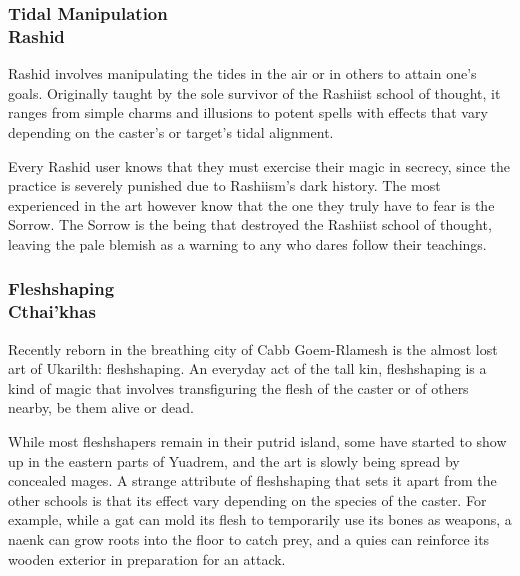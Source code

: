 \subsubsection{Tidal Manipulation\\ \small{Rashid}} %
Rashid involves manipulating the tides in the air or in others to attain one's goals.
Originally taught by the sole survivor of the Rashiist school of thought, it ranges from simple charms and illusions to potent spells with effects that vary depending on the caster's or target's tidal alignment.

Every Rashid user knows that they must exercise their magic in secrecy, since the practice is severely punished due to Rashiism's dark history.
The most experienced in the art however know that the one they truly have to fear is the Sorrow.
The Sorrow is the being that destroyed the Rashiist school of thought, leaving the pale blemish as a warning to any who dares follow their teachings.

\subsubsection{Fleshshaping\\ \small{Cthai'khas}} %
Recently reborn in the breathing city of Cabb Goem-Rlamesh is the almost lost art of Ukarilth: fleshshaping.
An everyday act of the tall kin, fleshshaping is a kind of magic that involves transfiguring the flesh of the caster or of others nearby, be them alive or dead.

While most fleshshapers remain in their putrid island, some have started to show up in the eastern parts of Yuadrem, and the art is slowly being spread by concealed mages.
A strange attribute of fleshshaping that sets it apart from the other schools is that its effect vary depending on the species of the caster.
For example, while a gat can mold its flesh to temporarily use its bones as weapons, a naenk can grow roots into the floor to catch prey, and a quies can reinforce its wooden exterior in preparation for an attack.
